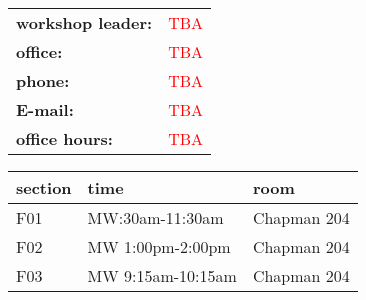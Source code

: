 \documentclass[11pt,fleqn]{article}
\begin{document}
\begin{multicols}{2}
\begin{tabular}{ll}
\textbf{workshop leader:}& \textcolor{red}{TBA}\\
\textbf{office:}& \textcolor{red}{TBA}\\
\textbf{phone:}& \textcolor{red}{TBA}\\
\textbf{E-mail:}& \textcolor{red}{TBA}\\
\textbf{office hours:}& \textcolor{red}{TBA}\\
\end{tabular}

\begin{tabular}{| l | l | l |}
\hline
section & time & room \\
\hline \hline
F01&MW\:\:10:30am-11:30am&Chapman 204\\ \hline
F02&MW 1:00pm-2:00pm&Chapman 204\\ \hline
F03&MW 9:15am-10:15am&Chapman 204\\ \hline
\end{tabular}
\end{multicols}
\end{document}
